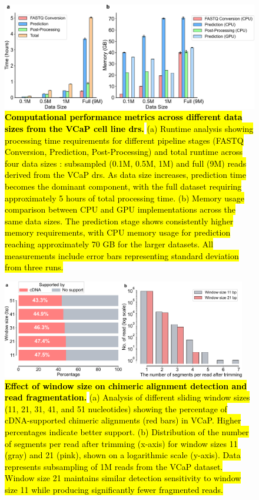 \documentclass[pdflatex,sn-nature, lineno]{sn-jnl}%
\begin{document}
\begin{figure}[!ht]
	\includegraphics[height=0.4\columnwidth]{finals/sf2a}
	\caption{ {\bf \hl{Computational performance metrics across different data sizes from the VCaP cell line \mbox{\gls{drs}}.}} \hl{(a) Runtime analysis showing processing time requirements for different pipeline stages (FASTQ Conversion, Prediction, Post-Processing) and total runtime across four data sizes : subsampled (0.1M, 0.5M, 1M) and full (9M) reads derived from the VCaP \mbox{\gls{drs}}. As data size increases, prediction time becomes the dominant component, with the full dataset requiring approximately 5 hours of total processing time. (b) Memory usage comparison between CPU and GPU implementations across the same data sizes. The prediction stage shows consistently higher memory requirements, with CPU memory usage for prediction reaching approximately 70 GB for the larger datasets. All measurements include error bars representing standard deviation from three runs.}}\label{fig:sf2a}
\end{figure}

\begin{figure}
	\begin{center}
		\includegraphics[width=0.95\textwidth]{finals/slidewindow}
	\end{center}
	\caption{ {\bf \hl{Effect of window size on chimeric alignment detection and read fragmentation.}}
		\hl{(a) Analysis of different sliding window sizes (11, 21, 31, 41, and 51
			nucleotides) showing the percentage of cDNA-supported chimeric alignments (red bars) in VCaP.
			Higher percentages indicate better support.
			(b) Distribution of the number of segments per read after trimming (x-axis) for window sizes 11 (gray) and 21 (pink), shown on a logarithmic scale (y-axis). Data represents subsampling of 1M reads from the VCaP dataset. Window size 21
			maintains similar detection sensitivity to window size 11 while producing
			significantly fewer fragmented reads.}}
	\label{fig:slidewindow}
\end{figure}
\end{document}
